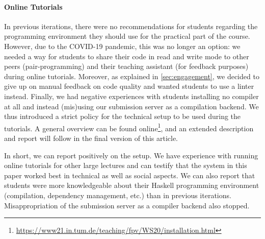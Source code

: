 \paragraph{Online Tutorials}
In previous iterations,
there were no recommendations for students regarding the programming environment they should use for the practical part of the course.
However, due to the COVID-19 pandemic,
this was no longer an option:
we needed a way for students to share their code in read and write mode
to other peers (pair-programming) and their teaching assistant (for feedback purposes) during online tutorials.
Moreover, as explained in \cref{sec:engagement},
we decided to give up on manual feedback on code quality
and wanted students to use a linter instead.
Finally, we had negative experiences with students
installing no compiler at all
and instead (mis)using our submission server as a compilation backend.
We thus introduced a strict policy
for the technical setup to be used during
the tutorials.
A general overview can be found online\footnote{\url{https://www21.in.tum.de/teaching/fpv/WS20/installation.html}},
and an extended description and report will follow in the final version of this article.

In short, we can report positively on the setup.
We have experience with running online tutorials for other large lectures and can testify that
the system in this paper worked best in technical as well as social aspects.
We can also report that students were more knowledgeable
about their Haskell programming environment (compilation, dependency management, etc.) than in previous iterations.
Misappropriation of the submission server as a compiler backend also stopped.
